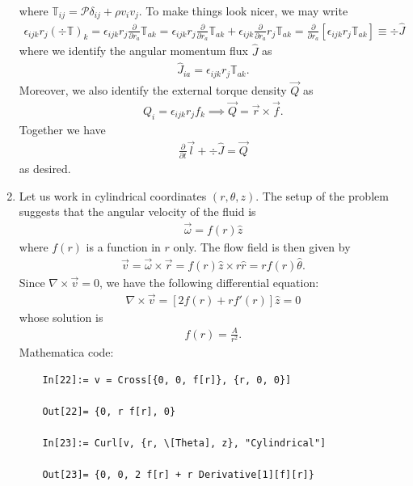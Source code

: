\documentclass{article}
\theoremstyle{definition}
\newcommand{\p}{\partial}
\newcommand{\f}[2]{\frac{#1}{#2}}
\newcommand{\lb}{\left[}
\newcommand{\rb}{\right]}
\begin{document}
\begin{enumerate}[label=(\alph*)]
	where $\mathbb{T}_{ij} = \mathcal{P} \delta_{ij} + \rho v_i v_j$. To make things look nicer, we may write
	\begin{align*}
	\epsilon_{ijk} r_j (\div \mathbb{T})_k = \epsilon_{ijk} r_j \f{\p}{\p r_a} \mathbb{T}_{ak} = \epsilon_{ijk} r_j \f{\p}{\p r_a}  \mathbb{T}_{ak} + \epsilon_{ijk} \f{\p}{\p r_a}  r_j  \mathbb{T}_{ak} = \f{\p}{\p r_a} \lb \epsilon_{ijk} r_j \mathbb{T}_{ak} \rb \equiv \div \hat{J}
	\end{align*}
	where we identify the angular momentum flux $\hat J$ as
	\begin{align*}
	\hat{J}_{ia} = \epsilon_{ijk} r_j \mathbb{T}_{ak}. 
	\end{align*}
	Moreover, we also identify the external torque density $\vec{Q}$ as 
	\begin{align*}
	Q_i = \epsilon_{ijk} r_j f_k \implies \vec{Q} = \vec{r} \times \vec{f}.
	\end{align*}
	Together we have
	\begin{align*}
	\f{\p}{\p t}\vec{l} + \div \hat J = \vec{Q}
	\end{align*}
	as desired. 
	
	\item Let us work in cylindrical coordinates $(r,\theta,z)$. The setup of the problem suggests that the angular velocity of the fluid is 
	\begin{align*}
	\vec{\omega} = f(r) \hat z
	\end{align*}
	where $f(r)$ is a function in $r$ only. The flow field is then given by 
	\begin{align*}
	\vec{v} = \vec{\omega}\times \vec{r} = f(r)\hat{z} \times r\hat{r} = rf(r) \hat\theta.
	\end{align*}
	Since $\nabla \times \vec{v} = 0$, we have the following differential equation:
	\begin{align*}
	\nabla \times \vec{v} = [2 f(r) + rf'(r)] \hat{z} = 0
	\end{align*}
	whose solution is 
	\begin{align*}
	f(r) = \f{A}{r^2}.
	\end{align*}
	Mathematica code:
	\begin{lstlisting}
	In[22]:= v = Cross[{0, 0, f[r]}, {r, 0, 0}]
	
	Out[22]= {0, r f[r], 0}
	
	In[23]:= Curl[v, {r, \[Theta], z}, "Cylindrical"]
	
	Out[23]= {0, 0, 2 f[r] + r Derivative[1][f][r]}
	

\end{lstlisting}
\end{enumerate}
\end{document}
